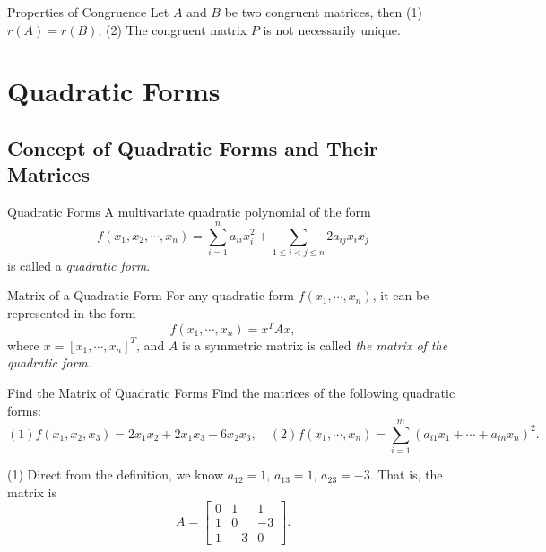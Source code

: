 \begin{proposition}{Properties of Congruence}{}
  Let $A$ and $B$ be two congruent matrices,
  then (1) $r(A) = r(B)$; (2) The congruent matrix $P$ is not necessarily unique.
\end{proposition}

\section{Quadratic Forms}

\subsection{Concept of Quadratic Forms and Their Matrices}

\begin{definition}{Quadratic Forms}{}
  A multivariate quadratic polynomial of the form
  \begin{equation}
    f(x_1,x_2,\cdots,x_n) = \sum\limits_{i = 1}^n a_{ii}x_i^2 + \sum\limits_{1 \leq i < j \leq n} 2a_{ij}x_ix_j
  \end{equation}
  is called a \emph{quadratic form}.
\end{definition}

\begin{definition}{Matrix of a Quadratic Form}{}
  For any quadratic form $f(x_1,\cdots,x_n)$,
  it can be represented in the form
  \begin{equation}
    f(x_1,\cdots,x_n) = x^TAx,
  \end{equation}
  where $x = [x_1,\cdots,x_n]^T$,
  and $A$ is a symmetric matrix is called \emph{the matrix of the quadratic
    form}.
\end{definition}

\begin{example}{Find the Matrix of Quadratic Forms}{}
  Find the matrices of the following quadratic forms:
  \begin{equation}
    (1) f(x_1, x_2, x_3) = 2x_1x_2 + 2x_1x_3 - 6x_2x_3, \quad
    (2) f(x_1,\cdots,x_n) = \sum\limits_{i = 1}^m (a_{i1}x_1 + \cdots + a_{in}x_n)^2.
  \end{equation}
\end{example}

\begin{solution}
  (1) Direct from the definition, we know $a_{12} = 1$, $a_{13} = 1$, $a_{23} = -3$.
  That is, the matrix is
  \begin{equation}
    A = \left[
      \begin{array}{ccc}
        0&1&1\\
        1&0&-3\\
        1&-3&0
      \end{array}
    \right].
  \end{equation}
\end{solution}

